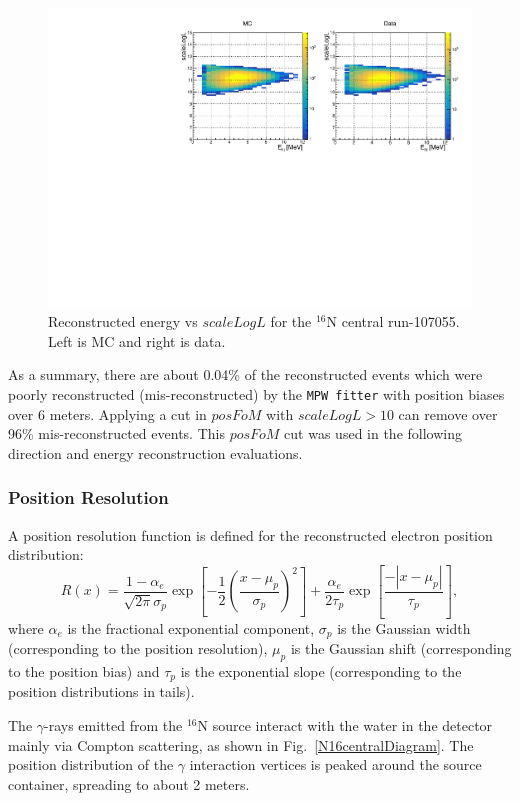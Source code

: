 \begin{figure}[!htb]
	\centering
	\includegraphics[width=13cm]{N16_107055_scaleLogLvsEnergy.pdf}
	\caption{Reconstructed energy vs $scaleLogL$ for the $^{16}$N central run-107055. Left is MC and right is data.}
	\label{energyVsFOM}
\end{figure}

As a summary, there are about 0.04\% of the reconstructed events which were poorly reconstructed (mis-reconstructed) by the \texttt{MPW fitter} with position biases over 6 meters. Applying a cut in $posFoM$ with $scaleLogL>10$ can remove over 96\% mis-reconstructed events. This $posFoM$ cut was used in the following direction and energy reconstruction evaluations.

\subsubsection{Position Resolution}
A position resolution function is defined for the reconstructed electron position distribution\cite{boulay2004direct}:
\begin{equation}
R(x)=\frac{1-\alpha_e}{\sqrt{2\pi}\sigma_p}\exp{[-\frac{1}{2}(\frac{x-\mu_p}{\sigma_p})^2]+\frac{\alpha_e}{2\tau_p}\exp{[\frac{-|x-\mu_p|}{\tau_p}]}},
\end{equation}
where $\alpha_e$ is the fractional exponential component, $\sigma_p$ is
the Gaussian width (corresponding to the position resolution), $\mu_p$ is the Gaussian shift (corresponding to the position bias) and $\tau_p$ is the exponential slope (corresponding to the position distributions in tails).

The $\gamma$-rays emitted from the $^{16}$N source interact with the water in the detector mainly via Compton scattering, as shown in Fig.~\ref{N16centralDiagram}. The position distribution of the $\gamma$ interaction vertices is peaked around the source container, spreading to about 2 meters.

